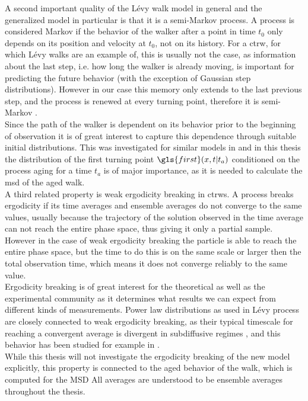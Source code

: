 { \color{blue}
A second important quality of the L\'evy walk model in general and the generalized model in particular is that it is a semi-Markov process. A process is considered Markov if the behavior of the walker after a point in time $t_0$ only depends on its position and velocity at $t_0$, not on its history. For a \gls{ctrw}, for which L\'evy walks are an example of, this is usually not the case, as information about the last step, i.e. how long the walker is already moving, is important for predicting the future behavior (with the exception of Gaussian step distributions). However in our case this memory only extends to the last previous step, and the process is renewed at every turning point, therefore it is semi-Markov \cite{lwreview}.\\
Since the path of the walker is dependent on its behavior prior to the beginning of observation it is of great interest to capture this dependence through suitable initial distributions. This was investigated for similar models in \cite{barkai2003a, barkai2003b} and in this thesis the distribution of the first turning point $\gls{first}(x,t|t_a)$ conditioned on the process aging for a time $t_a$ is of major importance, as it is needed to calculate the \gls{msd} of the aged walk.\\

A third related property is weak ergodicity breaking in \gls{ctrw}s. A process breaks ergodicity if its time averages and ensemble averages do not converge to the same values, usually because the trajectory of the solution observed in the time average can not reach the entire phase space, thus giving it only a partial sample. However in the case of weak ergodicity breaking the particle is able to reach the entire phase space, but the time to do this is on the same scale or larger then the total observation time, which means it does not converge reliably to the same value. \\
Ergodicity breaking is of great interest for the theoretical as well as the experimental community as it determines what results we can expect from different kinds of measurements. Power law distributions as used in L\'evy process are closely connected to weak ergodicity breaking, as their typical timescale for reaching a convergent average is divergent in subdiffusive regimes \cite{anomalousTransport}, and this behavior has been studied for example in \cite{brokmann2003,radons2018}.\\
While this thesis will not investigate the ergodicity breaking of the new model explicitly, this property is connected to the aged behavior of the walk, which is computed for the MSD
}
All averages are understood to be ensemble averages throughout the thesis.

